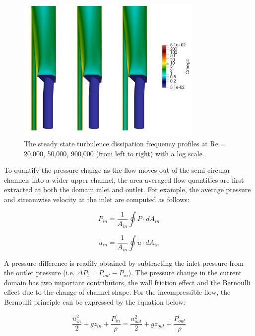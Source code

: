 \begin{figure}[!ht]
\centering
\includegraphics[width=0.8\textwidth]{./figures/reflector_omega.png}
\caption{The steady state turbulence dissipation frequency profiles at Re = 20,000, 50,000, 900,000 (from left to right) with a log scale. }
\label{fig:reflector_omega}
\end{figure}

To quantify the pressure change as the flow moves out of the semi-circular channels into a wider upper channel, the area-averaged flow quantities are first extracted at both the domain inlet and outlet. For example, the average pressure and streamwise velocity at the inlet are computed as follows: 

\begin{equation}
    P_{in} = \frac{1}{A_{in}} \oint P \cdot dA_{in}
\end{equation}

\begin{equation}
    u_{in} = \frac{1}{A_{in}} \oint u \cdot dA_{in}
\end{equation}

A pressure difference is readily obtained by subtracting the inlet pressure from the outlet pressure (i.e. $\Delta P_t = P_{out} - P_{in}$). The pressure change in the current domain has two important contributors, the wall friction effect and the Bernoulli effect due to the change of channel shape. For the incompressible flow, the Bernoulli principle can be expressed by the equation below: 

\begin{equation}
    \frac{u_{in}^2}{2} + gz_{in} + \frac{P^\prime_{in}}{\rho} = \frac{u_{out}^2}{2} + gz_{out} + \frac{P^\prime_{out}}{\rho}
\end{equation}


